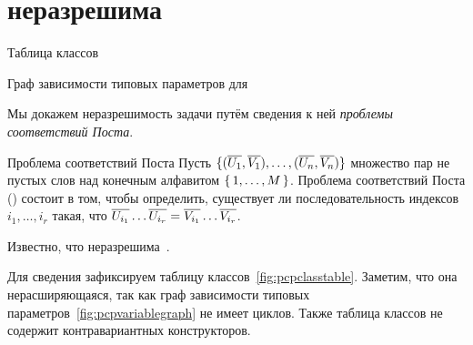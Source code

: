 \section{\subtypesat{} неразрешима}

\begin{Listing}%
\pcpct{}
\caption{Таблица классов \pcpctid{}}
\label{fig:pcpclasstable}
\end{Listing}

\begin{Figure}

\caption{Граф зависимости типовых параметров для \pcpctid{}}
\label{fig:pcpvariablegraph}
\end{Figure}


Мы докажем неразрешимость задачи \subtypesat{} путём сведения к ней \emph{проблемы соответствий Поста}.
%
\begin{paragraph}{Проблема соответствий Поста}
Пусть $\lbrace (\overline{{U}_{1}}, \overline{{V}_{1}}), \ldots , (\overline{{U}_{n}}, \overline{{V}_{n}})\rbrace$ множество пар не пустых слов над конечным алфавитом $\lbrace \, {1},\ldots,{M} \, \rbrace$. Проблема соответствий Поста (\pcp) состоит в том, чтобы определить, существует ли последовательность индексов $i_1, \ldots, i_r$ такая, что $\overline{{U}_{i_1}} \ldots \overline{{U}_{i_r}}= \overline{{V}_{i_1}} \ldots \overline{{V}_{i_r}}$.
\end{paragraph}
%


Известно, что \pcp{} неразрешима~\cite{post1946variant}.

Для сведения зафиксируем таблицу классов~\autoref{fig:pcpclasstable}. Заметим, что она нерасширяющаяся, так как граф зависимости типовых параметров~\autoref{fig:pcpvariablegraph} не имеет циклов. Также таблица классов не содержит контравариантных конструкторов.

